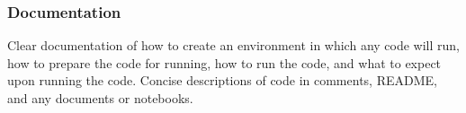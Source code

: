 \documentclass[a4paper, 12pt]{scrartcl}
\begin{document}
    \subsubsection*{Documentation}
    Clear documentation of how to create an environment in which any code will run, how to prepare the code for running, how to run the code, and what to expect upon running the code. Concise descriptions of code in comments, README, and any documents or notebooks.
    
  
  
  
\end{document}
